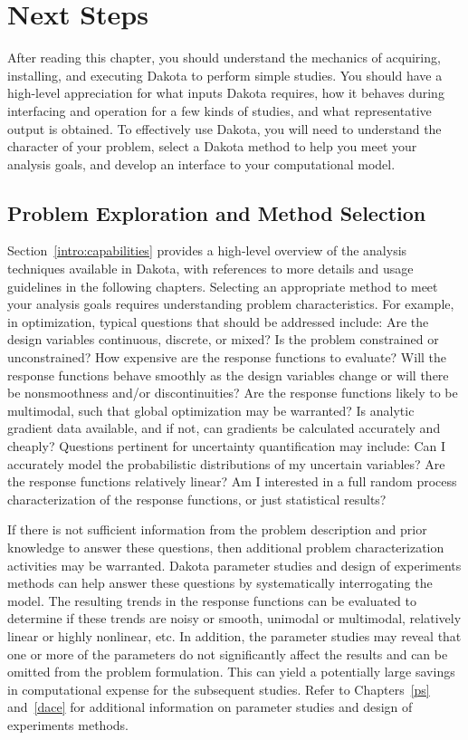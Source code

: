 \section{Next Steps}\label{tutorial:nextsteps}

After reading this chapter, you should understand the mechanics of
acquiring, installing, and executing Dakota to perform simple studies.
You should have a high-level appreciation for what inputs Dakota
requires, how it behaves during interfacing and operation for a few
kinds of studies, and what representative output is obtained.  To
effectively use Dakota, you will need to understand the character of
your problem, select a Dakota method to help you meet your analysis
goals, and develop an interface to your computational model.

\subsection{Problem Exploration and Method Selection}\label{tutorial:exploration}

Section~\ref{intro:capabilities} provides a high-level overview of the
analysis techniques available in Dakota, with references to more
details and usage guidelines in the following chapters.  Selecting an
appropriate method to meet your analysis goals requires understanding
problem characteristics.  For example, in optimization, typical
questions that should be addressed include: Are the design variables
continuous, discrete, or mixed? Is the problem constrained or
unconstrained? How expensive are the response functions to evaluate?
Will the response functions behave smoothly as the design variables
change or will there be nonsmoothness and/or discontinuities? Are the
response functions likely to be multimodal, such that global
optimization may be warranted? Is analytic gradient data available,
and if not, can gradients be calculated accurately and cheaply?
Questions pertinent for uncertainty quantification may include: Can I
accurately model the probabilistic distributions of my uncertain
variables? Are the response functions relatively linear? Am I
interested in a full random process characterization of the response
functions, or just statistical results?

If there is not sufficient information from the problem description
and prior knowledge to answer these questions, then additional problem
characterization activities may be warranted. Dakota parameter studies
and design of experiments methods can help answer these questions by
systematically interrogating the model.  The resulting trends in the
response functions can be evaluated to determine if these trends are
noisy or smooth, unimodal or multimodal, relatively linear or highly
nonlinear, etc. In addition, the parameter studies may reveal that one
or more of the parameters do not significantly affect the results and
can be omitted from the problem formulation. This can yield a
potentially large savings in computational expense for the subsequent
studies. Refer to Chapters~\ref{ps} and~\ref{dace} for additional
information on parameter studies and design of experiments methods.

